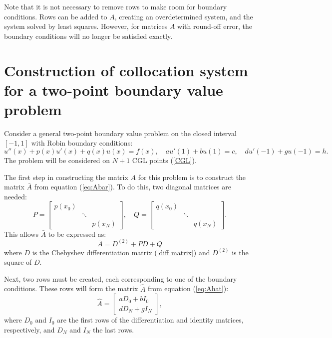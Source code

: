 \documentclass{sfuthesis}
\begin{document}
Note that it is not necessary to remove rows to make room for boundary conditions.
Rows can be added to $A$, creating an overdetermined system, and the system solved by least squares.
However, for matrices $A$ with round-off error, the boundary conditions will no longer be satisfied exactly.

\section{Construction of collocation system for a two-point boundary value problem}

Consider a general two-point boundary value problem on the closed interval $[-1,1]$ with Robin boundary conditions:
\begin{equation}
u''(x) + p(x) u'(x) + q(x) u(x) = f(x), \quad a u'(1) + b u(1) = c, \quad d u'(-1) + g u(-1) = h .
\end{equation}
The problem will be considered on $N+1$ CGL points (\ref{CGL}).

The first step in constructing the matrix $A$ for this problem is to construct the matrix $\bar{A}$ from equation (\ref{eq:Abar}).
To do this, two diagonal matrices are needed:
\begin{equation}
P = \begin{bmatrix} p(x_0) & & \\ & \ddots & \\ & & p(x_N) \end{bmatrix}, \quad Q = \begin{bmatrix} q(x_0) & & \\ & \ddots & \\ & & q(x_N) \end{bmatrix}.
\end{equation}
This allows $\bar{A}$ to be expressed as:
\begin{equation}
\bar{A} = D^{(2)} + P D + Q
\end{equation}
where $D$ is the Chebyshev differentiation matrix (\ref{diff matrix}) and $D^{(2)}$ is the square of $D$.

Next, two rows must be created, each corresponding to one of the boundary conditions.
These rows will form the matrix $\hat{A}$ from equation (\ref{eq:Ahat}):
\begin{equation}
\hat{A} = \begin{bmatrix} a D_0 + b I_0 \\ d D_N + g I_N \end{bmatrix},
\end{equation}
where $D_0$ and $I_0$ are the first rows of the differentiation and identity matrices, respectively, and $D_N$ and $I_N$ the last rows.
\end{document}

